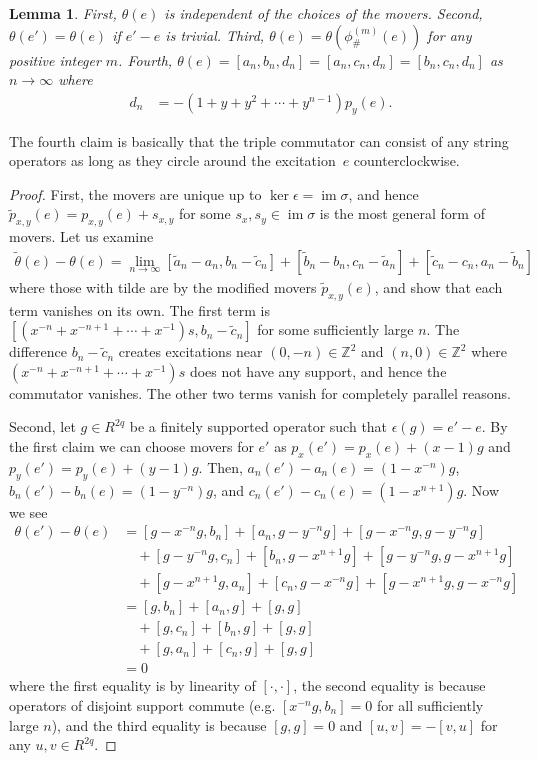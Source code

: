 \documentclass[aps,pra,
floatfix,notitlepage,
nofootinbib,
longbibliography,11pt]{revtex4-1}
\newtheorem{lemma}{Lemma}[section]
\theoremstyle{definition}
\newcommand{\ZZ}{{\mathbb{Z}}}
\newcommand{\cg}[1]{{\phi_\#^{({#1})}}}
\DeclareMathOperator{\im}{\mathrm{im}}
\begin{document}
\begin{lemma}\label{lem:thetawelldefined}
First, $\theta(e)$ is independent of the choices of the movers.
Second, $\theta(e') = \theta(e)$ if $e'-e$ is trivial.
Third, $\theta(e) = \theta(\cg{m}(e))$ for any positive integer $m$.
Fourth, $\theta(e) = [a_n,b_n,d_n] = [a_n,c_n,d_n] = [b_n,c_n,d_n]$ as $n \to \infty$
where
\begin{align}
d_n &= -(1+ y + y^2 + \cdots +y^{n-1})p_y(e).
\end{align}
\end{lemma}
The fourth claim is basically that the triple commutator can consist of
any string operators as long as they circle around the excitation~$e$ counterclockwise.
\begin{proof}
First, 
the movers are unique up to $\ker \epsilon = \im \sigma$,
and hence $\tilde p_{x,y}(e) = p_{x,y}(e) + s_{x,y}$ for some $s_x,s_y \in \im \sigma$ 
is the most general form of movers.
Let us examine
\begin{align}
\tilde \theta(e) - \theta(e) = 
\lim_{n\to \infty}
[\tilde a_n - a_n, b_n - \tilde c_n] + 
[\tilde b_n - b_n, c_n - \tilde a_n] + 
[\tilde c_n - c_n, a_n - \tilde b_n]
\end{align}
where those with tilde are by the modified movers $\tilde p_{x,y}(e)$,
and show that each term vanishes on its own.
The first term is $[(x^{-n} + x^{-n+1} + \cdots + x^{-1})s, b_n - \tilde c_n]$ 
for some sufficiently large $n$.
The difference $b_n - \tilde c_n$ creates excitations near $(0,-n) \in \ZZ^2$ and $(n,0) \in \ZZ^2$ where
$(x^{-n} + x^{-n+1} + \cdots + x^{-1})s$ does not have any support,
and hence the commutator vanishes.
The other two terms vanish for completely parallel reasons.

Second,
let $g \in R^{2q}$ be a finitely supported operator such that $\epsilon(g) = e' - e$.
By the first claim we can choose movers for $e'$ as $p_x(e') = p_x(e) + (x-1)g$ 
and $p_y(e') = p_y(e) + (y-1)g$.
Then,
$a_n(e') - a_n(e) = (1-x^{-n})g$,
$b_n(e') - b_n(e) = (1-y^{-n})g$,
and $c_n(e') - c_n(e) = (1-x^{n+1})g$.
Now we see
\begin{align}
\theta(e') - \theta(e) 
&=
[g-x^{-n}g,b_n] + [a_n, g - y^{-n}g] + [g-x^{-n}g,g - y^{-n}g]\nonumber\\
&\quad+
[g - y^{-n}g,c_n] + [b_n,g - x^{n+1}g] + [g - y^{-n}g,g - x^{n+1}g]\nonumber\\
&\quad+
[g - x^{n+1}g,a_n] + [c_n,g-x^{-n}g] + [g - x^{n+1}g,g-x^{-n}g]\nonumber\\
&=
[g, b_n] + [a_n, g] + [g,g]\nonumber\\
&\quad +
[g,c_n] + [b_n,g] + [g,g]\\
&\quad +
[g,a_n] + [c_n,g] + [g,g]\nonumber\\
&= 0\nonumber
\end{align}
where 
the first equality is by linearity of $[\cdot,\cdot]$,
the second equality is because operators of disjoint support commute 
(e.g. $[x^{-n}g,b_n]=0$ for all sufficiently large $n$),
and the third equality is because $[g,g]=0$ and $[u,v]=-[v,u]$ for any $u,v\in R^{2q}$.


\end{proof}
\end{document}

